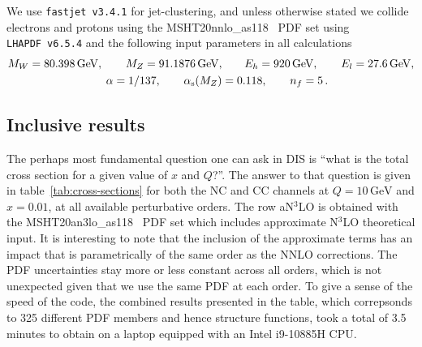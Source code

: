 \documentclass[submission, PhysCodeb]{SciPost}
\newcommand{\as}{\alpha_{\mathrm{s}}}
\newcommand{\GEV}{\,\mathrm{GeV}}
\newcommand{\NNNLO}{N$^3$LO}
\begin{document}
We use {\tt fastjet~v3.4.1} for jet-clustering, and unless otherwise
stated we collide electrons and protons using the
MSHT20nnlo\_as118~\cite{Bailey:2020ooq} PDF set using {\tt
  LHAPDF~v6.5.4} and the following input parameters in all
calculations
\begin{align}
  \label{eq:setup}
  M_W = 80.398\GEV, \qquad M_Z = 91.1876\GEV, &\qquad E_h = 920\GEV, \qquad E_l = 27.6\GEV,  \\ \notag
  \alpha = 1/137, \qquad \as(M_Z) &= 0.118, \qquad n_f = 5\,.
\end{align}

\subsection{Inclusive results}
The perhaps most fundamental question one can ask in DIS is ``what is
the total cross section for a given value of $x$ and $Q$?''. The
answer to that question is given in table~\ref{tab:cross-sections} for
both the NC and CC channels at $Q=10\GEV$ and $x=0.01$, at all
available perturbative orders.  The row a\NNNLO{} is obtained with the
MSHT20an3lo\_as118~\cite{McGowan:2022nag} PDF set which includes
approximate \NNNLO{} theoretical input. It is interesting to note that
the inclusion of the approximate terms has an impact that is
parametrically of the same order as the NNLO corrections. The PDF
uncertainties stay more or less constant across all orders, which is
not unexpected given that we use the same PDF at each order. To give a
sense of the speed of the code, the combined results presented in the
table, which correpsonds to 325 different PDF members and hence
structure functions, took a total of 3.5 minutes to obtain on a laptop
equipped with an Intel i9-10885H CPU.
\end{document}
